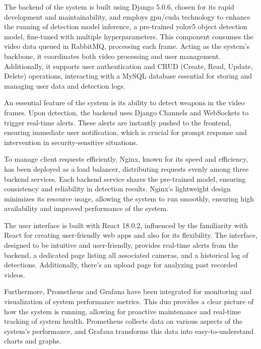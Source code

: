 The backend of the system is built using Django 5.0.6, chosen for its rapid development and maintainability, 
and employs \ac{gpu}/\ac{cuda} technology to enhance the 
running of detection model inference, a pre-trained \ac{yolo}v5 object detection model, fine-tuned with multiple
hyperparameters.
This component consumes the video data queued in RabbitMQ, 
processing each frame. Acting as the system's backbone, it coordinates both video processing and user 
management. Additionally, it supports user authentication and CRUD (Create, Read, Update, Delete) operations, 
interacting with a MySQL database essential for storing and managing user data and detection logs.

An essential feature of the system is its ability to detect weapons in the video frames. Upon detection, the backend 
uses Django Channels and WebSockets to trigger real-time alerts. These alerts are instantly pushed to the frontend, 
ensuring immediate user notification, which is crucial for prompt response and intervention in 
security-sensitive situations.

To manage client requests efficiently, Nginx, known for its speed and efficiency, has been deployed as a load balancer, 
distributing requests evenly among three backend services.
Each backend service shares the pre-trained model, ensuring consistency and reliability in detection results. 
Nginx's lightweight design minimizes its resource usage, allowing the system to run smoothly, ensuring high 
availability and improved performance of the system.


The user interface is built with React 18.0.2, influenced by the familiarity with React for creating user-friendly web 
apps and also for its flexibility. The interface, designed to be intuitive and user-friendly, 
provides real-time alerts from the backend, a dedicated page listing 
all associated cameras, and a historical log of detections. Additionally, there's an upload page for analyzing past 
recorded videos.

Furthermore, Prometheus and Grafana have been integrated for monitoring and visualization of system performance metrics.
This duo provides a clear picture of how the system is running, allowing for proactive maintenance and real-time 
tracking of system health.  Prometheus collects data on various aspects of the system's performance, and Grafana 
transforms this data into easy-to-understand charts and graphs.

